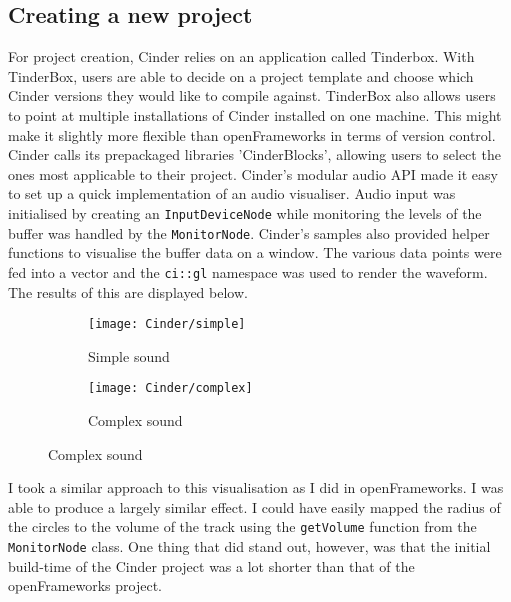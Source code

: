 \documentclass[../main_frameworkreview.tex]{subfiles}
\begin{document}
\subsection{Creating a new project}
For project creation, Cinder relies on an application called Tinderbox. With TinderBox, users are able to decide on a project template and choose which Cinder versions they would like to compile against. TinderBox also allows users to point at multiple installations of Cinder installed on one machine. This might make it slightly more flexible than openFrameworks in terms of version control. Cinder calls its prepackaged libraries 'CinderBlocks', allowing users to select the ones most applicable to their project. Cinder's modular audio API made it easy to set up a quick implementation of an audio visualiser. Audio input was initialised by creating an \verb|InputDeviceNode| while monitoring the levels of the buffer was handled by the \verb|MonitorNode|. Cinder's samples also provided helper functions to visualise the buffer data on a window. The various data points were fed into a vector and the \verb|ci::gl| namespace was used to render the waveform. The results of this are displayed below.
\begin{figure}[h]
  \begin{subfigure}{0.5\textwidth}
    \texttt{[image: Cinder/simple]}
    \caption{Simple sound}
  \end{subfigure}
  \begin{subfigure}{0.5\textwidth}
    \texttt{[image: Cinder/complex]}
    \caption{Complex sound}
  \end{subfigure}
\end{figure}
I took a similar approach to this visualisation as I did in openFrameworks. I was able to produce a largely similar effect. I could have easily mapped the radius of the circles to the volume of the track using the \verb|getVolume| function from the \verb|MonitorNode| class. One thing that did stand out, however, was that the initial build-time of the Cinder project was a lot shorter than that of the openFrameworks project.
\end{document}
